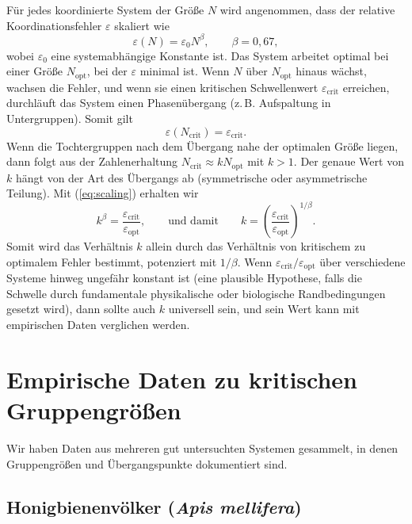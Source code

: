\documentclass[12pt]{article}
\theoremstyle{remark}
\begin{document}
	Für jedes koordinierte System der Größe $N$ wird angenommen, dass der relative Koordinationsfehler $\varepsilon$ skaliert wie
	\begin{equation}
		\varepsilon(N) = \varepsilon_0 N^{\beta}, \qquad \beta = 0,67,
		\label{eq:scaling}
	\end{equation}
	wobei $\varepsilon_0$ eine systemabhängige Konstante ist. Das System arbeitet optimal bei einer Größe $N_{\text{opt}}$, bei der $\varepsilon$ minimal ist. Wenn $N$ über $N_{\text{opt}}$ hinaus wächst, wachsen die Fehler, und wenn sie einen kritischen Schwellenwert $\varepsilon_{\text{crit}}$ erreichen, durchläuft das System einen Phasenübergang (z. B. Aufspaltung in Untergruppen). Somit gilt
	\begin{equation}
		\varepsilon(N_{\text{crit}}) = \varepsilon_{\text{crit}}.
	\end{equation}
	Wenn die Tochtergruppen nach dem Übergang nahe der optimalen Größe liegen, dann folgt aus der Zahlenerhaltung $N_{\text{crit}} \approx k N_{\text{opt}}$ mit $k > 1$. Der genaue Wert von $k$ hängt von der Art des Übergangs ab (symmetrische oder asymmetrische Teilung). Mit (\ref{eq:scaling}) erhalten wir
	\begin{equation}
		k^{\beta} = \frac{\varepsilon_{\text{crit}}}{\varepsilon_{\text{opt}}}, 
		\qquad\text{und damit}\qquad 
		k = \left( \frac{\varepsilon_{\text{crit}}}{\varepsilon_{\text{opt}}} \right)^{1/\beta}.
		\label{eq:k}
	\end{equation}
	Somit wird das Verhältnis $k$ allein durch das Verhältnis von kritischem zu optimalem Fehler bestimmt, potenziert mit $1/\beta$. Wenn $\varepsilon_{\text{crit}}/\varepsilon_{\text{opt}}$ über verschiedene Systeme hinweg ungefähr konstant ist (eine plausible Hypothese, falls die Schwelle durch fundamentale physikalische oder biologische Randbedingungen gesetzt wird), dann sollte auch $k$ universell sein, und sein Wert kann mit empirischen Daten verglichen werden.
	
	\section{Empirische Daten zu kritischen Gruppengrößen}
	\label{sec:data}
	
	Wir haben Daten aus mehreren gut untersuchten Systemen gesammelt, in denen Gruppengrößen und Übergangspunkte dokumentiert sind.
	
	\subsection{Honigbienenvölker (\textit{Apis mellifera})}
	\label{subsec:bees}
	
\end{document}
